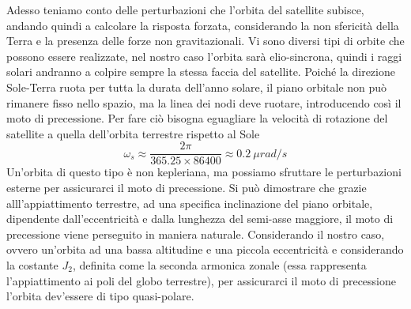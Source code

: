 Adesso teniamo conto delle perturbazioni che l'orbita del satellite subisce,
andando quindi a calcolare la risposta forzata, considerando la non sfericità
della Terra e la presenza delle forze non gravitazionali. Vi sono diversi tipi
di orbite che possono essere realizzate, nel nostro caso l'orbita sarà
elio-sincrona, quindi i raggi solari andranno a colpire sempre la stessa faccia
del satellite. Poiché la direzione Sole-Terra ruota per tutta la durata
dell'anno solare, il piano orbitale non può rimanere fisso nello spazio, ma la
linea dei nodi deve ruotare, introducendo così il moto di precessione. Per fare
ciò bisogna eguagliare la velocità di rotazione del satellite a quella
dell'orbita terrestre rispetto al Sole
\begin{equation}
\omega_s\approx \frac{2\pi}{365.25\times86400}\approx 0.2 \ \mu rad/s
\end{equation}
Un'orbita di questo tipo è non kepleriana, ma possiamo sfruttare le
perturbazioni esterne per assicurarci il moto di precessione. Si può dimostrare
che grazie alll'appiattimento terrestre, ad una specifica inclinazione del piano
orbitale, dipendente dall'eccentricità e dalla lunghezza del semi-asse maggiore,
il moto di precessione viene perseguito in maniera naturale. Considerando il
nostro caso, ovvero un'orbita ad una bassa altitudine e una piccola eccentricità
e considerando la costante $J_2$, definita come la seconda armonica zonale (essa
rappresenta l'appiattimento ai poli del globo terrestre), per assicurarci il
moto di precessione l'orbita dev'essere di tipo quasi-polare.

